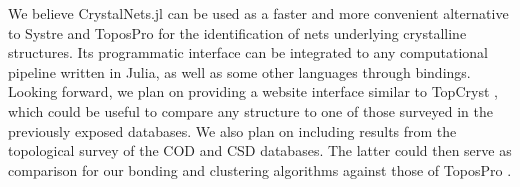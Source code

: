 \documentclass[main.tex]{subfiles}
\begin{document}
We believe CrystalNets.jl can be used as a faster and more convenient alternative to Systre and ToposPro for the identification of nets underlying crystalline structures. Its programmatic interface can be integrated to any computational pipeline written in Julia, as well as some other languages through bindings. Looking forward, we plan on providing a website interface similar to TopCryst \autocite{TopCryst}, which could be useful to compare any structure to one of those surveyed in the previously exposed databases. We also plan on including results from the topological survey of the COD \autocite{COD} and CSD \autocite{CSD} databases. The latter could then serve as comparison for our bonding and clustering algorithms against those of ToposPro \autocite{BlatovCSD}.
\end{document}
